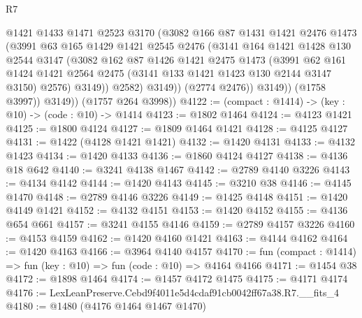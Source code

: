 \begin{lexlean}{R7}
\begin{coremodule}
                    @1421
                    @1433
                    @1471
                    @2523
                    @3170
                    (@3082
                      @166
                      @87
                      @1431
                      @1421
                      @2476
                      @1473
                      (@3991
                        @63
                        @165
                        @1429
                        @1421
                        @2545
                        @2476
                        (@3141
                          @164
                          @1421
                          @1428
                          @130
                          @2544
                          @3147
                          (@3082
                            @162
                            @87
                            @1426
                            @1421
                            @2475
                            @1473
                            (@3991
                              @62
                              @161
                              @1424
                              @1421
                              @2564
                              @2475
                              (@3141 @133 @1421 @1423 @130 @2144 @3147 @3150)
                              @2576)
                            @3149))
                        @2582)
                      @3149))
                  (@2774 @2476))
                @3149))
            (@1758 @3997))
          @3149))
      (@1757 @264 @3998))
@4122 := (compact : @1414) -> (key : @10) -> (code : @10) -> @1414
@4123 := @1802 @1464
@4124 := @4123 @1421
@4125 := @1800 @4124
@4127 := @1809 @1464 @1421
@4128 := @4125 @4127
@4131 := @1422 (@4128 @1421 @1421)
@4132 := @1420 @4131
@4133 := @4132 @1423
@4134 := @1420 @4133
@4136 := @1860 @4124 @4127
@4138 := @4136 @18 @642
@4140 := @3241 @4138 @1467
@4142 := @2789 @4140 @3226
@4143 := @4134 @4142
@4144 := @1420 @4143
@4145 := @3210 @38
@4146 := @4145 @1470
@4148 := @2789 @4146 @3226
@4149 := @1425 @4148
@4151 := @1420 @4149 @1421
@4152 := @4132 @4151
@4153 := @1420 @4152
@4155 := @4136 @654 @661
@4157 := @3241 @4155 @4146
@4159 := @2789 @4157 @3226
@4160 := @4153 @4159
@4162 := @1420 @4160 @1421
@4163 := @4144 @4162
@4164 := @1420 @4163
@4166 := @3964 @4140 @4157
@4170 := fun (compact : @1414) => fun (key : @10) => fun (code : @10) => @4164 @4166
@4171 := @1454 @38
@4172 := @1898 @1464
@4174 := @1457 @4172 @1475
@4175 := @4171 @4174
@4176 := LexLeanPreserve.Cebd9f4011e5d4cdaf91cb0042ff67a38.R7.__fits_4
@4180 := @1480 (@4176 @1464 @1467 @1470)

\end{coremodule}
\end{lexlean}
